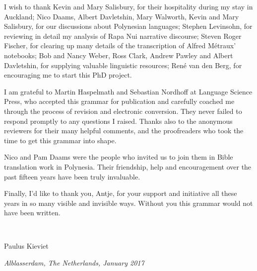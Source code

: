 I wish to thank Kevin and Mary Salisbury, for their hospitality during my stay in Auckland; Nico Daams, Albert Davletshin, Mary Walworth, Kevin and Mary Salisbury, for our discussions about Polynesian languages; Stephen Levinsohn, for reviewing in detail my analysis of Rapa Nui narrative discourse; Steven Roger Fischer, for clearing up many details of the transcription of Alfred Métraux’ notebooks; Bob and Nancy Weber, Ross Clark, Andrew Pawley and Albert Davletshin, for supplying valuable linguistic resources; René van den Berg, for encouraging me to start this PhD project.

I am grateful to Martin Haspelmath and Sebastian Nordhoff at Language Science Press, who accepted this grammar for publication and carefully coached me through the process of revision and electronic conversion. They never failed to respond promptly to any questions I raised. Thanks also to the anonymous reviewers for their many helpful comments, and the proofreaders who took the time to get this grammar into shape.

Nico and Pam Daams were the people who invited us to join them in Bible translation work in Polynesia. Their friendship, help and encouragement over the past fifteen years have been truly invaluable. 

Finally, I’d like to thank you, Antje, for your support and initiative all these years in so many visible and invisible ways. Without you this grammar would not have been written.

~

Paulus Kieviet

\textit{Alblasserdam, The Netherlands, January 2017}

